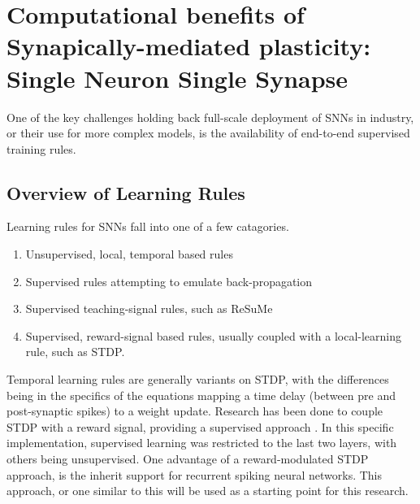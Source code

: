     
    \section{Computational benefits of Synapically-mediated plasticity: Single Neuron Single Synapse}
    One of the key challenges holding back full-scale deployment of SNNs in
    industry, or their use for more complex models, is the availability of
    end-to-end supervised training rules.
    
    \subsection{Overview of Learning Rules}
    Learning rules for SNNs fall into one of a few catagories.
    \begin{enumerate}
        \item Unsupervised, local, temporal based rules
        \item Supervised rules attempting to emulate back-propagation
        \item Supervised teaching-signal rules, such as ReSuMe
        \item Supervised, reward-signal based rules, usually coupled with a
          local-learning rule, such as STDP.
    \end{enumerate}
    
    Temporal learning rules are generally variants on STDP, with the differences
    being in the specifics of the equations mapping a time delay (between pre
    and post-synaptic spikes) to a weight update. Research has been done to
    couple STDP with a reward signal, providing a supervised approach
    \cite{rstdp_mnist}. In this specific implementation, supervised learning was
    restricted to the last two layers, with others being unsupervised. One
    advantage of a reward-modulated STDP approach, is the inherit support for
    recurrent spiking neural networks. This approach, or one similar to this
    will be used as a starting point for this research.
    
